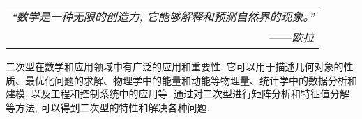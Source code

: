 \begin{flushright}
    \begin{tabular}{r||}
        \textit{“数学是一种无限的创造力, 它能够解释和预测自然界的现象。”}\\
        ——\textit{欧拉}
    \end{tabular}
\end{flushright}

二次型在数学和应用领域中有广泛的应用和重要性. 它可以用于描述几何对象的性质、最优化问题的求解、物理学中的能量和动能等物理量、统计学中的数据分析和建模, 以及工程和控制系统中的应用等. 通过对二次型进行矩阵分析和特征值分解等方法, 可以得到二次型的特性和解决各种问题. 